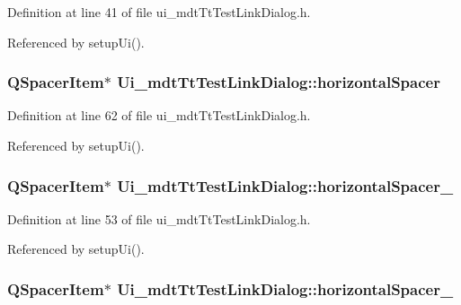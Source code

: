 Definition at line 41 of file ui\-\_\-mdt\-Tt\-Test\-Link\-Dialog.\-h.



Referenced by setup\-Ui().

\hypertarget{class_ui__mdt_tt_test_link_dialog_a28aca1bd98f1aedec9297a7663bb3b92}{
\subsubsection[{horizontal\-Spacer}]{\setlength{\rightskip}{0pt plus 5cm}Q\-Spacer\-Item$\ast$ Ui\-\_\-mdt\-Tt\-Test\-Link\-Dialog\-::horizontal\-Spacer}}\label{class_ui__mdt_tt_test_link_dialog_a28aca1bd98f1aedec9297a7663bb3b92}


Definition at line 62 of file ui\-\_\-mdt\-Tt\-Test\-Link\-Dialog.\-h.



Referenced by setup\-Ui().

\hypertarget{class_ui__mdt_tt_test_link_dialog_a84e2e5456dd04a4fc94d1bc294ecee0d}{
\subsubsection[{horizontal\-Spacer\-\_\-2}]{\setlength{\rightskip}{0pt plus 5cm}Q\-Spacer\-Item$\ast$ Ui\-\_\-mdt\-Tt\-Test\-Link\-Dialog\-::horizontal\-Spacer\-\_}}\label{class_ui__mdt_tt_test_link_dialog_a84e2e5456dd04a4fc94d1bc294ecee0d}


Definition at line 53 of file ui\-\_\-mdt\-Tt\-Test\-Link\-Dialog.\-h.



Referenced by setup\-Ui().

\hypertarget{class_ui__mdt_tt_test_link_dialog_a3d5e185d67539230b8c9b96e53aef018}{
\subsubsection[{horizontal\-Spacer\-\_\-3}]{\setlength{\rightskip}{0pt plus 5cm}Q\-Spacer\-Item$\ast$ Ui\-\_\-mdt\-Tt\-Test\-Link\-Dialog\-::horizontal\-Spacer\-\_}}\label{class_ui__mdt_tt_test_link_dialog_a3d5e185d67539230b8c9b96e53aef018}


